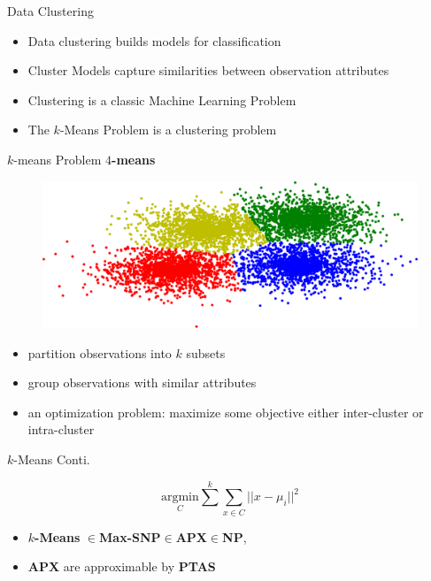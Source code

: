 \documentclass[12pt]{beamer}
\begin{document}
\begin{frame}[plain]{Data Clustering}
\begin{itemize}
 \item Data clustering builds models for classification
 \item Cluster Models capture similarities between observation attributes
 \item Clustering is a classic Machine Learning Problem
 \item The $k$-Means Problem is a clustering problem
\end{itemize}
\end{frame}

\begin{frame}[plain]{$k$-means Problem}
\centering
\textbf{$4$-means}
\begin{figure}
 \centerline{\includegraphics[width=.7\textwidth]{figs/kmean}}
\end{figure}
\vspace*{-3\bigskipamount}
 \begin{itemize}
  \item partition observations into $k$ subsets
  \item group observations with similar attributes
  \item an optimization problem: maximize some objective either inter-cluster or intra-cluster
 \end{itemize}
\end{frame}


\begin{frame}[plain]{$k$-Means Conti.}
\begin{Theorem}
 $$
{\underset{C}{\text{argmin}}} {\overset{k}{\sum}} {\underset{x\in C}{\sum}} ||x-\mu_i||^2
$$
\end{Theorem}
\begin{itemize}
 \item \textbf{$k$-Means} $\in$\textbf{Max-SNP}$\in$\textbf{APX}$\in$\textbf{NP},
 \item \textbf{APX} are approximable by \textbf{PTAS}
\end{itemize}
\end{frame}
\end{document}
